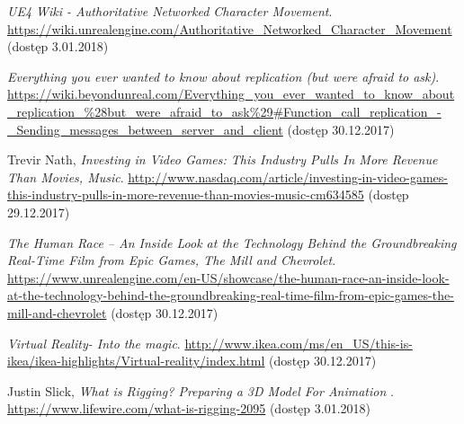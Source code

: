 \documentclass[multip]{SGGW-thesis}
\begin{document}
\begin{thebibliography}{9}
\textit{UE4 Wiki - Authoritative Networked Character Movement}. \url{https://wiki.unrealengine.com/Authoritative_Networked_Character_Movement}  (dostęp 3.01.2018)

\textit{Everything you ever wanted to know about replication (but were afraid to ask)}. \url{https://wiki.beyondunreal.com/Everything_you_ever_wanted_to_know_about_replication_\%28but_were_afraid_to_ask\%29#Function_call_replication_-_Sending_messages_between_server_and_client} (dostęp 30.12.2017)

Trevir Nath, \textit{Investing in Video Games: This Industry Pulls In More Revenue Than Movies, Music}.
\url{http://www.nasdaq.com/article/investing-in-video-games-this-industry-pulls-in-more-revenue-than-movies-music-cm634585} {\mbox(dostęp 29.12.2017)}

\textit{The Human Race – An Inside Look at the Technology Behind the Groundbreaking Real-Time Film from Epic Games, The Mill and Chevrolet}. \url{https://www.unrealengine.com/en-US/showcase/the-human-race-an-inside-look-at-the-technology-behind-the-groundbreaking-real-time-film-from-epic-games-the-mill-and-chevrolet} (dostęp 30.12.2017)

\textit{Virtual Reality- Into the magic}. \url{http://www.ikea.com/ms/en_US/this-is-ikea/ikea-highlights/Virtual-reality/index.html} (dostęp 30.12.2017)

Justin Slick, \textit{What is Rigging? Preparing a 3D Model For Animation }. \url{https://www.lifewire.com/what-is-rigging-2095}  (dostęp 3.01.2018)






\end{thebibliography}


\beforelastpage
 \thispagestyle{empty} \newpage \null \thispagestyle{empty}
\end{document}
